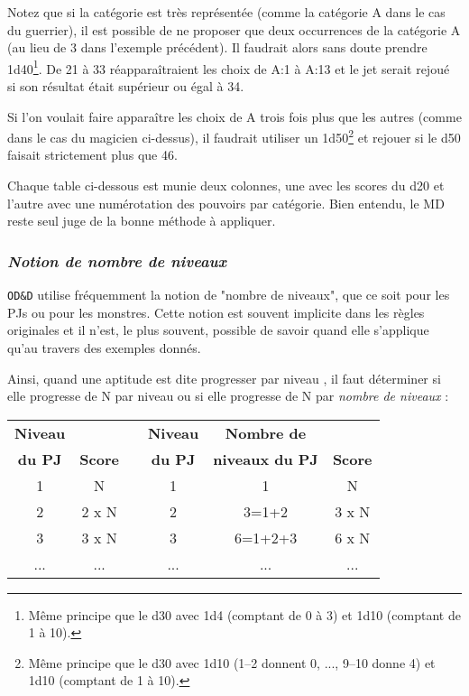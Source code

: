 \bigskip

Notez que si la catégorie est très représentée (comme la catégorie A dans le cas du guerrier), il est possible de ne proposer que deux occurrences de la catégorie A (au lieu de 3 dans l'exemple précédent). Il faudrait alors sans doute prendre 1d40\footnote{Même principe que le d30 avec 1d4 (comptant de 0 à 3) et 1d10 (comptant de 1 à 10).}. De 21 à 33 réapparaîtraient les choix de A:1 à A:13 et le jet serait rejoué si son résultat était supérieur ou égal à 34.

\bigskip

Si l'on voulait faire apparaître les choix de A trois fois plus que les autres (comme dans le cas du magicien ci-dessus), il faudrait utiliser un 1d50\footnote{Même principe que le d30 avec 1d10 (1--2 donnent 0, ..., 9--10 donne 4) et 1d10 (comptant de 1 à 10).} et rejouer si le d50 faisait strictement plus que 46.

\bigskip

Chaque table ci-dessous est munie deux colonnes, une avec les scores du d20 et l'autre avec une numérotation des pouvoirs par catégorie. Bien entendu, le MD reste seul juge de la bonne méthode à appliquer.

\subsubsection*{\textit{Notion de nombre de niveaux}}

\texttt{OD\&D} utilise fréquemment la notion de "nombre de niveaux", que ce soit pour les PJs ou pour les monstres. Cette notion est souvent implicite dans les règles originales et il n'est, le plus souvent, possible de savoir quand elle s'applique qu'au travers des exemples donnés.

\bigskip

Ainsi, quand une aptitude est dite progresser \og par niveau \fg{}, il faut déterminer si elle progresse de N \og par niveau \fg{} ou si elle progresse de N par \textit{nombre de niveaux} :

\bigskip

\begin{tabular}{ccp{3cm}ccc}
\textbf{Niveau} & && \textbf{Niveau} & \textbf{Nombre de} & \\
\textbf{du PJ} & \textbf{Score}&& \textbf{du PJ}  & \textbf{niveaux du PJ}& \textbf{Score} \\
1               & N             && 1                & 1                         & N  \\
2               & 2 x N         && 2                & 3=1+2                     & 3 x N \\
3               & 3 x N         && 3                & 6=1+2+3                   & 6 x N \\
...             & ...           && ...              & ...                       & ... \\
\end{tabular}

